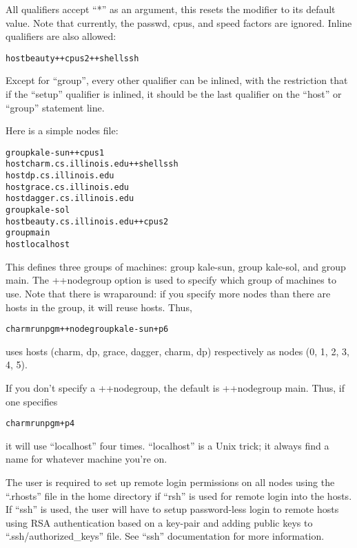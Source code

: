 All qualifiers accept ``*'' as an argument, this resets the modifier to
its default value.  Note that currently, the passwd, cpus, and speed
factors are ignored.  Inline qualifiers are also allowed:

\begin{alltt}
host beauty ++cpus 2 ++shell ssh
\end{alltt}

Except for ``group'', every other qualifier can be inlined, with the
restriction that if the ``setup'' qualifier is inlined, it should be
the last qualifier on the ``host'' or ``group'' statement line.

Here is a simple nodes file:

\begin{alltt}
        group kale-sun ++cpus 1
          host charm.cs.illinois.edu ++shell ssh
          host dp.cs.illinois.edu
          host grace.cs.illinois.edu
          host dagger.cs.illinois.edu
        group kale-sol
          host beauty.cs.illinois.edu ++cpus 2
        group main
          host localhost
\end{alltt}

This defines three groups of machines: group kale-sun, group kale-sol,
and group main.  The ++nodegroup option is used to specify which group
of machines to use.  Note that there is wraparound: if you specify
more nodes than there are hosts in the group, it will reuse
hosts. Thus,

\begin{alltt}
        charmrun pgm ++nodegroup kale-sun +p6
\end{alltt}

uses hosts (charm, dp, grace, dagger, charm, dp) respectively as
nodes (0, 1, 2, 3, 4, 5).

If you don't specify a ++nodegroup, the default is ++nodegroup main.
Thus, if one specifies

\begin{alltt}
        charmrun pgm +p4
\end{alltt}

it will use ``localhost'' four times.  ``localhost'' is a Unix
trick; it always find a name for whatever machine you're on.

The user is required to set up remote login permissions on all nodes
using the ``.rhosts'' file in the home directory if ``rsh'' is used for remote
login into the hosts. If ``ssh'' is used, the user will have to setup
password-less login to remote hosts using
RSA authentication based on a key-pair and adding public keys to 
``.ssh/authorized\_keys'' file. See ``ssh'' documentation for more information.

